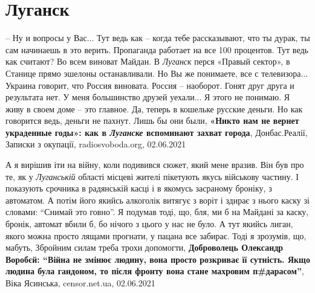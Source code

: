  
 
 
 
 
\chapter{Луганск}

– Ну и вопросы у Вас... Тут ведь как – когда тебе рассказывают, что ты дурак,
ты сам начинаешь в это верить. Пропаганда работает на все 100 процентов. Тут
ведь как считают? Во всем виноват Майдан. В \emph{Луганск} перся «Правый сектор», в
Станице прямо эшелоны останавливали. Но Вы же понимаете, все с телевизора...
Украина говорит, что Россия виновата. Россия – наоборот. Гонят друг друга и
результата нет. У меня большинство друзей уехали... Я этого не понимаю. Я живу в
своем доме – это главное. Да, теперь в кошельке русские деньги. Но как
говорится ведь, деньги не пахнут. Лишь бы они были,
\textbf{«Никто нам не вернет украденные годы»: как в \emph{Луганске} вспоминают захват города},
Донбас.Реалії, Записки з окупації, radiosvoboda.org, 02.06.2021

А я вирішив іти на війну, коли подивився сюжет, який мене вразив. Він був про
те, як у \emph{Луганській} області місцеві жителі пікетують якусь військову частину. І
показують срочника в радянській касці і в якомусь засраному броніку, з
автоматом. А потім його якийсь алкоголік витягує з воріт і здирає з нього каску
зі словами: \enquote{Снимай это говно}. Я подумав тоді, що, бля, ми б на Майдані за
каску, бронік, автомат вбили б, бо нічого з цього у нас не було. А тут якийсь
лиган, якого можна просто лящами прогнати, у пацана все забирає. Тоді я
зрозумів, що, мабуть, Збройним силам треба трохи допомогти, 
\textbf{Доброволець Олександр Воробєй: \enquote{Війна не змінює людину, вона
просто розкриває її сутність. Якщо людина була гандоном, то після фронту вона
стане махровим п\#дарасом}},
Віка Ясинська, censor.net.ua, 02.06.2021


